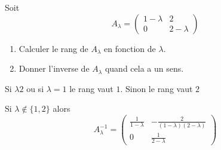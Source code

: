 \documentclass[a4paper, 11pt,reqno]{article}
\begin{document}
\begin{exercice}
Soit $$ A_\lambda=\left(\begin{array}{cc}  1-\lambda&2\\0&2-\lambda \end{array}\right)$$
\begin{enumerate}
\item Calculer le rang de $A_\lambda$ en fonction de $\lambda$.
\item Donner l'inverse de $A_\lambda$ quand cela a un sens.
\end{enumerate}
\end{exercice}

\begin{correction}
Si $\lambda 2$  ou si  $\lambda=1$  le rang vaut $1$. Sinon le rang vaut $2$


Si $\lambda \notin \{ 1,2\}$ alors 
$$A_\lambda^{-1} =  \left(\begin{array}{cc}  \frac1{1-\lambda}&-\frac{2}{(1-\lambda)(2-\lambda)}\\0&\frac1{2-\lambda} \end{array}\right)$$


\end{correction}
\end{document}
